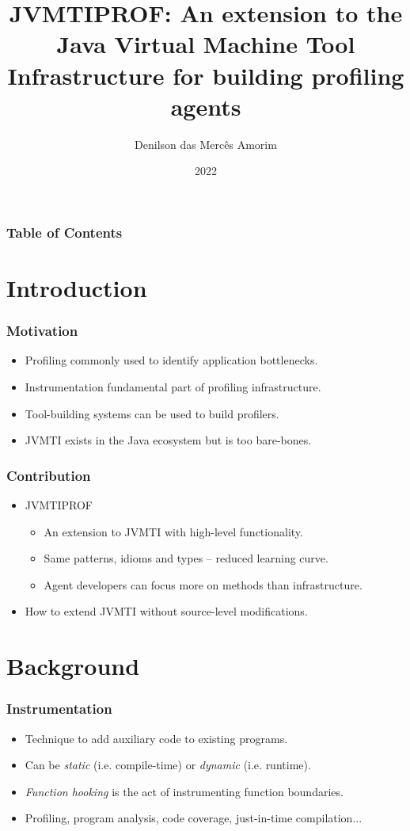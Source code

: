 \documentclass{beamer}
\title[JVMTIPROF]{JVMTIPROF: An extension to the Java Virtual Machine Tool Infrastructure for building profiling agents}
\author{Denilson das Mercês Amorim}
\institute[UFBA]{Universidade Federal da Bahia}
\date{2022}
\begin{document}
\frame{\titlepage}

\begin{frame}
\frametitle{Table of Contents}
\tableofcontents
\end{frame}

\section{Introduction}

\begin{frame}
\frametitle{Motivation}
\begin{itemize}
\item<1-> Profiling commonly used to identify application bottlenecks.
\item<1-> Instrumentation fundamental part of profiling infrastructure.
\item<1-> Tool-building systems can be used to build profilers.
\item<1-> JVMTI exists in the Java ecosystem but is too bare-bones.
\end{itemize}
\end{frame}

\begin{frame}
\frametitle{Contribution}
\begin{itemize}
\item<1-> JVMTIPROF
\begin{itemize}
\item An extension to JVMTI with high-level functionality.
\item Same patterns, idioms and types -- reduced learning curve.
\item Agent developers can focus more on methods than infrastructure.
\end{itemize}
\item<2-> How to extend JVMTI without source-level modifications.
\end{itemize}
\end{frame}

\section{Background}

\begin{frame}
\frametitle{Instrumentation}
\begin{itemize}
\item Technique to add auxiliary code to existing programs.
\item Can be \emph{static} (i.e. compile-time) or \emph{dynamic} (i.e. runtime).
\item \emph{Function hooking} is the act of instrumenting function boundaries.
\item Profiling, program analysis, code coverage, just-in-time compilation...
\end{itemize}
\end{frame}
\end{document}
